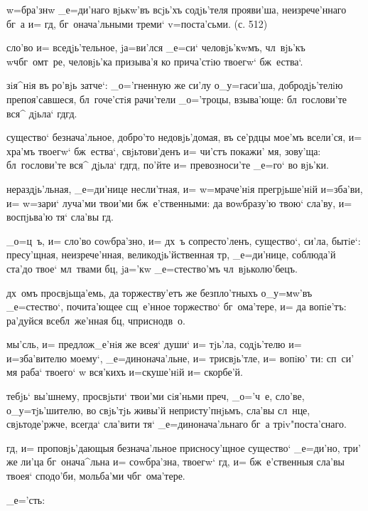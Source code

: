 w=бра'знw _е=ди'наго вjькw'въ всjь'хъ содjь'теля 
прояви'ша, неизрече'ннаго бг~а и= гд, бг~онача'льными 
треми` v=поста'сьми. (с. 512)

сло'во и= вседjь'тельное, jа=ви'лся _е=си` человjь'кwмъ, 
чл~вjь'къ w\т ч бг~омт~ре, человjь'ка призыва'я ко 
прича'стiю твоегw` бж~ества`.


зiя^нiя въ ро'вjь затче`: _о='гненную же си'лу 
о_у=гаси'ша, добродjь'телiю препоя'савшеся, бл~гоче'стiя 
рачи'тели _о='троцы, взыва'юще: бл~гослови'те вся^ дjьла` 
гд гд.

существо` безнача'льное, добро'то недовjь'домая, въ 
се'рдцы мое'мъ всели'ся, и= хра'мъ твоегw` бж~ества`, 
свjьтови'денъ и= чи'стъ покажи' мя, зову'ща: 
бл~гослови'те вся^ дjьла` гд гд, по'йте и= 
превозноси'те _е=го` во вjь'ки.

нераздjь'льная, _е=ди'нице несли'тная, и= w=мраче'нiя 
прегрjьше'нiй и=зба'ви, и= w=зари` луча'ми твои'ми 
бж~е'ственными: да воwбразу'ю твою` сла'ву, и= воспjьва'ю 
тя` сла'вы гд.

_о=ц~ъ, и= сло'во соwбра'зно, и= дх~ъ сопресто'ленъ, 
существо`, си'ла, бытiе`: пресу'щная, неизрече'нная, 
великодjь'йственная тр, _е=ди'нице, соблюда'й ста'до 
твое` мл~твами бц, jа='кw _е=стество'мъ 
чл~вjьколю'бецъ.


дх~омъ просвjьща'емь, да торжеству'етъ же безпло'тныхъ 
о_у=мw'въ _е=стество`, почита'ющее сщ~е'нное торжество` 
бг~ома'тере, и= да вопiе'тъ: ра'дуйся всебл~же'нная 
бц, ч приснодв~о.

мы'сль, и= предлож_е'нiя же всея` души` и= тjь'ла, 
содjь'телю и= и=зба'вителю моему`, _е=динонача'льне, и= 
трисвjь'тле, и= вопiю' ти: сп~си' мя раба` твоего` w\т 
вся'кихъ и=скуше'нiй и= скорбе'й. %

тебjь` вы'шнему, просвjьти` твои'ми сiя'ньми преч, 
_о='ч~е, сло'ве, о_у=тjь'шителю, во свjь'тjь живы'й 
непристу'пнjьмъ, сла'вы сл~нце, свjьтоде'ржче, всегда` 
сла'вити тя` _е=динонача'льнаго бг~а трiv"поста'снаго.

гд, и= проповjь'дающыя безнача'льное присносу'щное 
существо` _е=ди'но, три' же ли'ца бг~онача^льна и= 
соwбра'зна, твоегw` гд, и= бж~е'ственныя сла'вы 
твоея` сподо'би, мольба'ми ч бг~ома'тере.

_е='сть: %